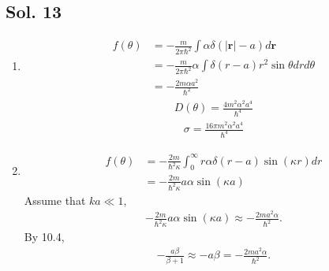 \subsection*{Sol. 13}
\begin{enumerate}
    \item \begin{align*}
              f(\theta)
               & =
              -\frac{m}{2\pi\hbar^2}
              \int\alpha\delta(|\bm r|-a)
              d\bm r \\
               & =
              -\frac{m}{2\pi\hbar^2}\alpha
              \int\delta(r-a)
              r^2\sin\theta drd\theta \\
               & =-\frac{2m\alpha  a^2}{\hbar^2}
          \end{align*}
          \begin{align*}
              D(\theta) = \frac{4m^2\alpha^2 a^4}{\hbar^4}
          \end{align*}
          \begin{align*}
              \sigma = \frac{16\pi m^2\alpha^2 a^4}{\hbar^4}
          \end{align*}
    \item
          \begin{align*}
              f(\theta) & =
              -\frac{2m}{\hbar^2\kappa}
              \int_0^\infty r\alpha \delta(r-a)\sin(\kappa r)dr \\
                        & =
              -\frac{2m}{\hbar^2\kappa}
              a\alpha \sin(\kappa a)
          \end{align*}
          Assume that $ka\ll 1$,
          \begin{align*}
              -\frac{2m}{\hbar^2\kappa}
              a\alpha \sin(\kappa a)
              \approx
              -\frac{2ma^2\alpha}{\hbar^2}.
          \end{align*}
          By 10.4,
          \begin{align*}
              -\frac{a\beta}{\beta+1}
              \approx
              -a\beta
              =-\frac{2ma^2\alpha}{\hbar^2}.
          \end{align*}
\end{enumerate}

